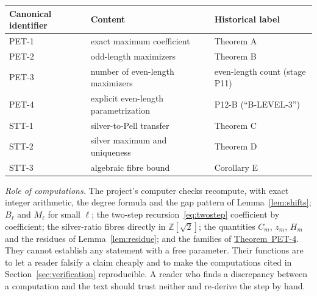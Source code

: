 \documentclass[11pt]{amsart}
\theoremstyle{definition}
\theoremstyle{remark}
\theoremstyle{plain}
\numberwithin{equation}{section}
\newcommand{\Z}{\mathbb{Z}}
\newcommand{\PETfour}{\hyperref[thm:pet4]{Theorem~PET-4}}
\begin{document}
\begin{center}
\small
\begin{tabular}{@{}lll@{}}
\toprule
Canonical identifier & Content & Historical label\\
\midrule
PET-1 & exact maximum coefficient & Theorem A\\
PET-2 & odd-length maximizers & Theorem B\\
PET-3 & number of even-length maximizers & even-length count (stage P11)\\
PET-4 & explicit even-length parametrization & P12-B (``B-LEVEL-3'')\\
STT-1 & silver-to-Pell transfer & Theorem C\\
STT-2 & silver maximum and uniqueness & Theorem D\\
STT-3 & algebraic fibre bound & Corollary E\\
\bottomrule
\end{tabular}
\end{center}

\emph{Role of computations.} The project's computer checks recompute, with exact integer arithmetic,
the degree formula and the gap pattern of Lemma~\ref{lem:shifts}; $B_\ell$ and $M_\ell$ for small
$\ell$; the two-step recursion~\eqref{eq:twostep} coefficient by coefficient; the silver-ratio fibres
directly in $\Z[\sqrt2]$; the quantities $C_m$, $z_m$, $H_m$ and the residues of
Lemma~\ref{lem:residue}; and the families of \PETfour. They cannot establish any statement with a free
parameter. Their functions are to let a reader falsify a claim cheaply and to make the computations
cited in Section~\ref{sec:verification} reproducible. A reader who finds a discrepancy between a
computation and the text should trust neither and re-derive the step by hand.
\end{document}
